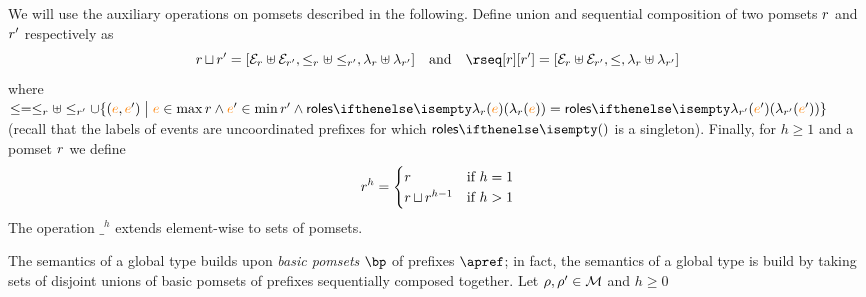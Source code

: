 %
We will use the auxiliary operations on pomsets described in the
following.
%
Define union and sequential composition of two pomsets
$r$ and $r'$ respectively as
\[
  \apom \pomsetcup \apom' =
  [\esetof{\apom} \uplus \esetof{\apom'},
  \leqof{\apom} \uplus \leqof{\apom'},
  \alfof{\apom} \uplus \alfof{\apom'}]
  \quad\text{and}\quad
  \rseq[\apom][\apom'] = 
  [\esetof{\apom} \uplus \esetof{\apom'},
  \leq,
  \alfof{\apom} \uplus \alfof{\apom'}]
\]
where
$\leq = \leqof{\apom} \uplus \leqof{\apom'} \cup \{(\ae,\ae') \sst \ae
\in \max \apom \land \ae' \in \min \apom' \land
\roles{\alfof{\apom}(\ae)} = \roles{\alfof{\apom'}(\ae')}\}$ (recall
that the labels of events are uncoordinated prefixes for which
$\roles{}$ is a singleton).
%
%
Finally, for $h \geq 1$ and a pomset $r$ we define
\[
  r^h =
  \begin{cases}
    r & \text{if } h = 1
    \\
    r \operatorname{\sqcup} r^{h-1} & \text{if } h > 1
  \end{cases}
\]
The operation $\_^h$ extends element-wise to sets of pomsets.

The semantics of a global type builds upon \emph{basic pomsets} $\bp$
of prefixes $\apref$; in fact, the semantics of a global type is build
by taking sets of disjoint unions of basic pomsets of prefixes
sequentially composed together.
%
Let $\rho,\rho' \in \mathcal{M}$ and $h \geq 0$

